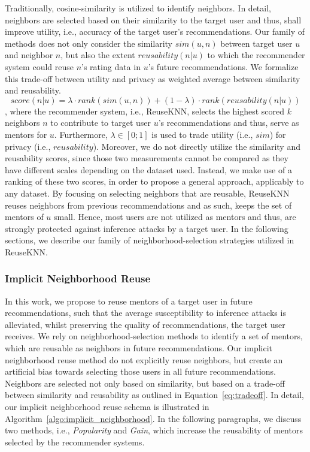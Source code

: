 \documentclass[manuscript,review,anonymous]{acmart}
\begin{document}
Traditionally, cosine-similarity is utilized to identify neighbors.
In detail, neighbors are selected based on their similarity to the target user and thus, shall improve utility, i.e., accuracy of the target user's recommendations.
Our family of methods does not only consider the similarity $sim(u, n)$ between target user $u$ and neighbor $n$, but also the extent $reusability(n|u)$ to which the recommender system could reuse $n$'s rating data in $u$'s future recommendations.
We formalize this trade-off between utility and privacy as weighted average between similarity and reusability.
\begin{equation}
    \label{eq:tradeoff}
    score(n|u) = \lambda \cdot rank(sim(u, n)) + (1 - \lambda) \cdot rank(reusability(n|u))
\end{equation}
, where the recommender system, i.e., ReuseKNN, selects the highest scored $k$ neighbors $n$ to contribute to target user $u$'s recommendations and thus, serve as mentors for $u$.
Furthermore, $\lambda \in [0; 1]$ is used to trade utility (i.e., $sim$) for privacy (i.e., $reusability$).
Moreover, we do not directly utilize the similarity and reusability scores, since those two measurements cannot be compared as they have different scales depending on the dataset used.
Instead, we make use of a ranking of these two scores, in order to propose a general approach, applicably to any dataset.
By focusing on selecting neighbors that are reusable, ReuseKNN reuses neighbors from previous recommendations and as such, keeps the set of mentors of $u$ small.
Hence, most users are not utilized as mentors and thus, are strongly protected against inference attacks by a target user.
In the following sections, we describe our family of neighborhood-selection strategies utilized in ReuseKNN.

\subsubsection{Implicit Neighborhood Reuse}
\label{subsubsec:implicitreuse}
In this work, we propose to reuse mentors of a target user in future recommendations, such that the average susceptibility to inference attacks is alleviated, whilst preserving the quality of recommendations, the target user receives.
We rely on neighborhood-selection methods to identify a set of mentors, which are reusable as neighbors in future recommendations.
Our implicit neighborhood reuse method do not explicitly reuse neighbors, but create an artificial bias towards selecting those users in all future recommendations.
Neighbors are selected not only based on similarity, but based on a trade-off between similarity and reusability as outlined in Equation~\ref{eq:tradeoff}.
In detail, our implicit neighborhood reuse schema is illustrated in Algorithm~\ref{algo:implicit_neighborhood}.
In the following paragraphs, we discuss two methods, i.e., \emph{Popularity} and \emph{Gain}, which increase the reusability of mentors selected by the recommender systems.
\end{document}
